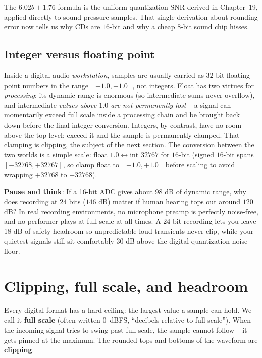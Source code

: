 \begin{connectionbox}
The $6.02b + 1.76$ formula is the uniform-quantization SNR derived in
Chapter~19, applied directly to sound pressure samples. That
single derivation about rounding error now
tells us why CDs are $16$-bit and why a cheap $8$-bit sound chip hisses.
\end{connectionbox}

\subsection*{Integer versus floating point}

Inside a digital audio \emph{workstation}, samples are usually carried as $32$-bit
floating-point numbers in the range $[-1.0, +1.0]$, not integers. Float has two virtues for
\emph{processing}: its dynamic range is enormous (so intermediate sums never overflow), and
intermediate \emph{values above $1.0$ are not permanently lost} -- a signal can momentarily exceed
full scale inside a processing chain and be brought back down before the final integer
conversion. Integers, by contrast, have no room above the top level; exceed it and the sample is
permanently clamped. That clamping is clipping, the subject of the next section. The conversion
between the two worlds is a simple scale: $\text{float } 1.0 \leftrightarrow \text{int } 32767$
for $16$-bit (signed $16$-bit spans $[-32768, +32767]$, so clamp float to $[-1.0, +1.0]$ before scaling to avoid wrapping $+32768$ to $-32768$).

\begin{recoverybox}
\textbf{Pause and think}: If a 16-bit ADC gives about 98 dB of dynamic range, why does recording at 24 bits ($146$ dB) matter if human hearing tops out around $120$ dB? In real recording environments, no microphone preamp is perfectly noise-free, and no performer plays at full scale at all times. A 24-bit recording lets you leave 18 dB of safety headroom so unpredictable loud transients never clip, while your quietest signals still sit comfortably $30$ dB above the digital quantization noise floor.
\end{recoverybox}

\section{Clipping, full scale, and headroom}
\label{ch26:clipping}

Every digital format has a hard ceiling: the largest value a sample can hold. We call it
\textbf{full scale} (often written $0$~dBFS, ``decibels relative to full scale''). When the
incoming signal tries to swing past full scale, the sample cannot follow -- it gets pinned at the
maximum. The rounded tops and bottoms of the waveform are \textbf{clipping}.

